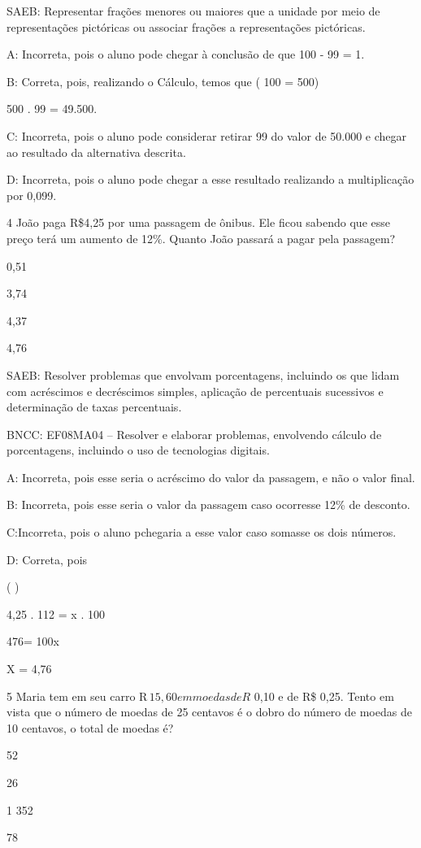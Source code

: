 {SAEB: Representar frações menores ou maiores que a unidade por meio de
representações pictóricas ou associar frações a representações
pictóricas.

A: Incorreta, pois o aluno pode chegar à conclusão de que 100 - 99 = 1.

B: Correta, pois, realizando o Cálculo, temos que
(  {100} = 500)

500 . 99 = 49.500.

C: Incorreta, pois o aluno pode considerar retirar 99 do valor de 50.000
e chegar ao resultado da alternativa descrita.

D: Incorreta, pois o aluno pode chegar a esse resultado realizando a
multiplicação por 0,099.

\num{4} João paga R\$4,25 por uma passagem de ônibus. Ele ficou sabendo que
esse preço terá um aumento de 12\%. Quanto João passará a pagar pela
passagem?
\item 0,51
\item 3,74
\item 4,37
\item 4,76

SAEB: Resolver problemas que envolvam porcentagens, incluindo os que
lidam com acréscimos e decréscimos simples, aplicação de percentuais
sucessivos e determinação de taxas percentuais.

BNCC: EF08MA04 -- Resolver e elaborar problemas, envolvendo cálculo de
porcentagens, incluindo o uso de tecnologias digitais.

A: Incorreta, pois esse seria o acréscimo do valor da passagem, e não o
valor final.

B: Incorreta, pois esse seria o valor da passagem caso ocorresse 12\% de
desconto.

C:Incorreta, pois o aluno pchegaria a esse valor caso somasse os dois
números.

D: Correta, pois

( \times {})

4,25 . 112 = x . 100

476= 100x

X = 4,76

\num{5} Maria tem em seu carro R$\,15,60 em moedas de R$ 0,10 e de R\$ 0,25.
Tento em vista que o número de moedas de 25 centavos é o dobro do número
de moedas de 10 centavos, o total de moedas é?
\item 52
\item 26
\item 1 352
\item 78

}
